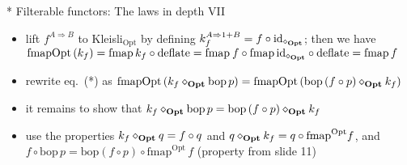 \documentclass[english]{beamer}
\begin{document}
\begin{frame}{{*} Filterable functors: The laws in depth VII}
\begin{itemize}
\begin{itemize}
\item lift $f^{A\Rightarrow B}$ to Kleisli$_{\text{Opt}}$ by defining
{\footnotesize{}$k_{f}^{A\Rightarrow1+B}=f\circ\text{id}_{\diamond_{\text{\textbf{Opt}}}}$;}
then we have $\text{fmapOpt}\left(k_{f}\right)=\text{fmap}\,k_{f}\circ\text{deflate}=\text{fmap}\:f\circ\text{fmap}\,\text{id}_{\diamond_{\text{\textbf{Opt}}}}\circ\text{deflate}=\text{fmap}\,f$
\item rewrite eq.\ ({*}) as {\footnotesize{}$\text{fmapOpt}\left(k_{f}\diamond_{\text{\textbf{Opt}}}\text{bop}\,p\right)=\text{fmapOpt}\left(\text{bop}\left(f\circ p\right)\diamond_{\text{\textbf{Opt}}}k_{f}\right)$ }{\footnotesize \par}
\item it remains to show that {\footnotesize{}$k_{f}\diamond_{\text{\textbf{Opt}}}\text{bop}\,p=\text{bop}\left(f\circ p\right)\diamond_{\text{\textbf{Opt}}}k_{f}$ }{\footnotesize \par}
\item use the properties {\footnotesize{}$k_{f}\diamond_{\text{\textbf{Opt}}}q=f\circ q$
and $q\diamond_{\text{\textbf{Opt}}}k_{f}=q\circ\text{fmap}^{\text{Opt}}f$,
and $f\circ\text{bop}\,p=\text{bop}\left(f\circ p\right)\circ\text{fmap}^{\text{Opt}}\,f$
(property from slide 11)}{\footnotesize \par}
\end{itemize}
\end{itemize}
\end{frame}
\end{document}
